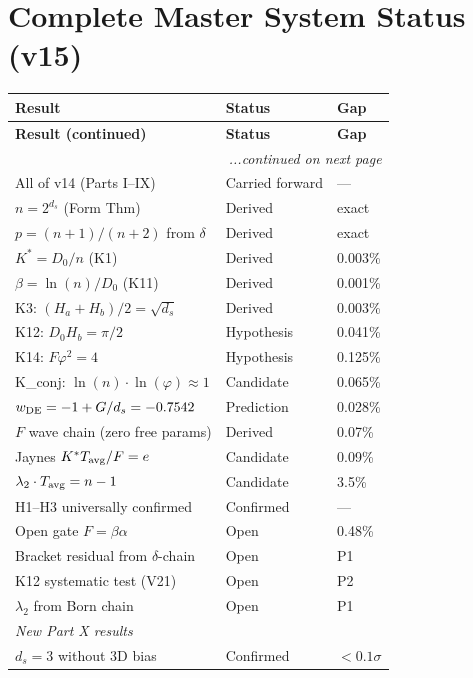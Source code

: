 \documentclass[12pt, a4paper]{article}
\begin{document}
\section{Complete Master System Status (v15)}

\renewcommand{\arraystretch}{1.5}
\begin{longtable}{p{8cm}p{2.8cm}p{1.8cm}}
\toprule
\textbf{Result} & \textbf{Status} & \textbf{Gap}\\
\midrule
\endfirsthead
\toprule
\textbf{Result (continued)} & \textbf{Status} & \textbf{Gap}\\
\midrule
\endhead
\midrule
\multicolumn{3}{r}{\emph{...continued on next page}} \\
\endfoot
\bottomrule
\endlastfoot
All of v14 (Parts I--IX) & Carried forward & ---\\
$n=2^{d_s}$ (Form Thm) & Derived & exact\\
$p=(n+1)/(n+2)$ from $\delta$ & Derived & exact\\
$K^*=D_0/n$ (K1) & Derived & 0.003\%\\
$\beta=\ln(n)/D_0$ (K11) & Derived & 0.001\%\\
K3: $(H_a+H_b)/2=\sqrt{d_s}$ & Derived & 0.003\%\\
K12: $D_0 H_b=\pi/2$ & Hypothesis & 0.041\%\\
K14: $F\varphi^2=4$ & Hypothesis & 0.125\%\\
K\_conj: $\ln(n)\cdot\ln(\varphi)\approx 1$ & Candidate & 0.065\%\\
$w_{\rm DE}=-1+G/d_s=-0.7542$ & Prediction & 0.028\%\\
$F$ wave chain (zero free params) & Derived & 0.07\%\\
Jaynes $K^*T_{\rm avg}/F=e$ & Candidate & 0.09\%\\
$\lambda_2\cdot T_{\rm avg}=n-1$ & Candidate & 3.5\%\\
H1--H3 universally confirmed & Confirmed & ---\\
Open gate $F=\beta\alpha$ & Open & 0.48\%\\
Bracket residual from $\delta$-chain & Open & P1\\
K12 systematic test (V21) & Open & P2\\
$\lambda_2$ from Born chain & Open & P1\\
\midrule
\multicolumn{3}{l}{\textit{New Part X results}}\\
$d_s=3$ without 3D bias & Confirmed & $<0.1\sigma$\\

\end{longtable}
\end{document}
